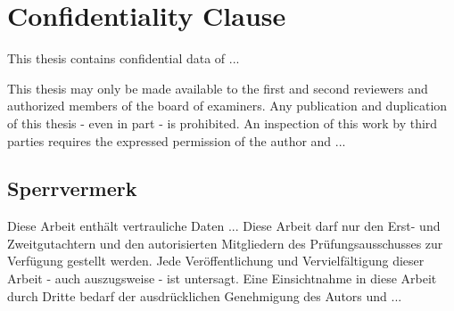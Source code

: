 \chapter*{Confidentiality Clause}

This thesis contains confidential data of ...

\bigskip\noindent
This thesis may only be made available to the first and second reviewers and authorized members of the board of examiners. Any publication and duplication of this thesis - even in part - is prohibited. An inspection of this work by third parties requires the expressed permission of the author and ...

\section*{Sperrvermerk}

Diese Arbeit enthält vertrauliche Daten ...
Diese Arbeit darf nur den Erst- und Zweitgutachtern und den autorisierten Mitgliedern des Prüfungsausschusses zur Verfügung gestellt werden. Jede Veröffentlichung und Vervielfältigung dieser Arbeit - auch auszugsweise - ist untersagt. Eine Einsichtnahme in diese Arbeit durch Dritte bedarf der ausdrücklichen Genehmigung des Autors und ...

\cleardoublepage